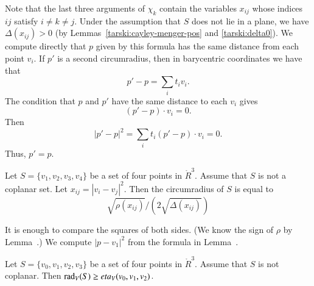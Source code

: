 \begin{tarskidata}
\begin{tarski}
\begin{proved}
Note that the last three arguments of $\chi_k$ 
contain the variables $x_{ij}$ whose
indices $ij$ satisfy $i\ne k\ne j$.
Under the assumption that $S$ does not lie
in a plane, we have $\Delta(x_{ij})>0$ (by Lemmas~\ref{tarski:cayley-menger-pos} and \ref{tarski:delta0}). 
We compute directly that $p$ given by this
formula has the same distance from each point
$v_i$.  If $p'$ is a second circumradius, then in 
barycentric coordinates we have that
  $$p'-p = \sum_i t_i v_i.$$
The condition that $p$ and $p'$ have the same distance to each $v_i$
gives
  $$(p'-p)\cdot v_i=0.$$
Then $$|p'-p|^2 = \sum_it_i (p'-p)\cdot v_i = 0.$$  
Thus, $p'=p$.
\swallowed\end{proved}
\end{tarski}





\begin{tarski}

\begin{lemma}
Let $S=\{v_1,v_2,v_3,v_4\}$ be a set of four points in $\ring{R}^3$.
Assume that $S$ is not a coplanar set.  
Let $x_{ij}=|v_i-v_j|^2$.
Then the circumradius of
	$S$ is equal to 
		$$
		\sqrt{\rho(x_{ij})}/
		(2\sqrt{\Delta(x_{ij})})
		$$
\end{lemma}

\begin{proved} It is enough to compare the
squares of both sides.  (We know the sign of
$\rho$ by Lemma~.)  We
compute $|p-v_1|^2$ from the formula
in Lemma~.
\swallowed\end{proved}
\end{tarski}




\begin{tarski}

\begin{lemma}
Let $S=\{v_0,v_1,v_2,v_3\}$ be a set of four points in $\ring{R}^3$.
Assume that $S$ is not coplanar.
Then $\operatorname{rad}_V(S) \ge eta_V(v_0,v_1,v_2)$.
\end{lemma}


\end{tarski}
\end{tarskidata}
